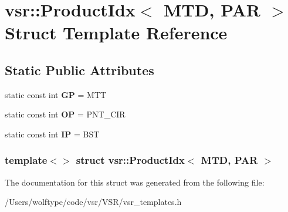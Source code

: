 \hypertarget{structvsr_1_1_product_idx_3_01_m_t_d_00_01_p_a_r_01_4}{\section{vsr\-:\-:Product\-Idx$<$ M\-T\-D, P\-A\-R $>$ Struct Template Reference}
\label{structvsr_1_1_product_idx_3_01_m_t_d_00_01_p_a_r_01_4}
}
\subsection*{Static Public Attributes}
\begin{DoxyCompactItemize}
\item 
\hypertarget{structvsr_1_1_product_idx_3_01_m_t_d_00_01_p_a_r_01_4_a9967143d122bf14c1e7d7b74720b7f6e}{static const int {\bfseries G\-P} = M\-T\-T}\label{structvsr_1_1_product_idx_3_01_m_t_d_00_01_p_a_r_01_4_a9967143d122bf14c1e7d7b74720b7f6e}

\item 
\hypertarget{structvsr_1_1_product_idx_3_01_m_t_d_00_01_p_a_r_01_4_abf622f57eb3801f7744ff3600bba2247}{static const int {\bfseries O\-P} = P\-N\-T\-\_\-\-C\-I\-R}\label{structvsr_1_1_product_idx_3_01_m_t_d_00_01_p_a_r_01_4_abf622f57eb3801f7744ff3600bba2247}

\item 
\hypertarget{structvsr_1_1_product_idx_3_01_m_t_d_00_01_p_a_r_01_4_ad56daa6614b6f493c5058a771fb21130}{static const int {\bfseries I\-P} = B\-S\-T}\label{structvsr_1_1_product_idx_3_01_m_t_d_00_01_p_a_r_01_4_ad56daa6614b6f493c5058a771fb21130}

\end{DoxyCompactItemize}
\subsubsection*{template$<$$>$ struct vsr\-::\-Product\-Idx$<$ M\-T\-D, P\-A\-R $>$}



The documentation for this struct was generated from the following file\-:\begin{DoxyCompactItemize}
\item 
/\-Users/wolftype/code/vsr/\-V\-S\-R/vsr\-\_\-templates.\-h\end{DoxyCompactItemize}
